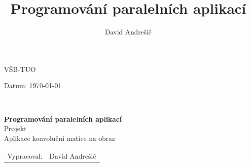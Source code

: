 \documentclass[10pt,a4paper]{article}
\author{David Andrešič}
\title{Programování paralelních aplikací}
\begin{document}
\begin{titlepage}

\begin{minipage}{0.4\textwidth}
\begin{flushleft}
VŠB-TUO
\end{flushleft}
\end{minipage}
\begin{minipage}{0.4\textwidth}
\begin{flushright}
Datum: \today
\end{flushright}
\end{minipage}\\[5.0cm]


\begin{center}

{\huge \bfseries Programování paralelních aplikací}\\[1.0cm]
{\huge Projekt}\\[1.5cm]
{\large Aplikace konvoluční matice na obraz}\\[4cm]

\end{center}

	
	

\vfill

\begin{minipage}{0.4\textwidth}
\begin{flushleft}
\begin{tabular}{lp{9cm}}
Vypracoval:&	David Andrešič	\\
\end{tabular}
\end{flushleft}
\end{minipage}

\end{titlepage}
\tableofcontents
\end{document}
